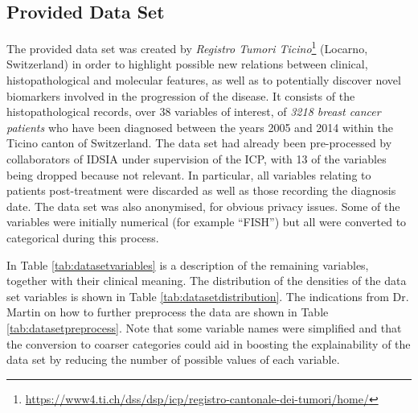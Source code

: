 \subsection{Provided Data Set}
The provided data set was created by \textit{Registro Tumori Ticino}\footnote{\url{https://www4.ti.ch/dss/dsp/icp/registro-cantonale-dei-tumori/home/}} (Locarno, Switzerland) in order to highlight possible new relations between clinical, histopathological and molecular features, as well as to potentially discover novel biomarkers involved in the progression of the disease.
It consists of the histopathological records, over 38 variables of interest, of \textit{3218 breast cancer patients} who have been diagnosed between the years 2005 and 2014 within the Ticino canton of Switzerland.
The data set had already been pre-processed by collaborators of IDSIA under supervision of the ICP, with 13 of the variables being dropped because not relevant.
In particular, all variables relating to patients post-treatment were discarded as well as those recording the diagnosis date.
The data set was also anonymised, for obvious privacy issues.
Some of the variables were initially numerical (for example \enquote{FISH}) but all were converted to categorical during this process.

In Table \ref{tab:datasetvariables} is a description of the remaining variables, together with their clinical meaning.
The distribution of the densities of the data set variables is shown in Table \ref{tab:datasetdistribution}.
The indications from Dr. Martin on how to further preprocess the data are shown in Table \ref{tab:datasetpreprocess}.
Note that some variable names were simplified and that the conversion to coarser categories could aid in boosting the explainability of the data set by reducing the number of possible values of each variable.


